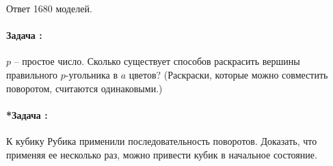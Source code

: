 \documentclass[amsmath,amssymb,12pt]{revtex4}
\newif\ifimportant
\newcommand{\1}{\frac{1}{2}}
\begin{document}
Ответ
1680 моделей.
\fi

\addtocounter{prn}{1}
\vspace{0.3cm}
\paragraph*{Задача \theprn: }

$p$ – простое число. Сколько существует способов раскрасить вершины правильного $p$-угольника в $a$ цветов? (Раскраски, которые можно совместить поворотом, считаются одинаковыми.)

\ifimportant
\medskip
\noindent
Решение
Забудем временно про совмещение раскрасок поворотами. Тогда p вершин можно раскрасить $a^{p}$ способами (см. задачу 60348). Среди этих раскрасок есть a одноцветных. Каждая из оставшихся совмещается с p раскрасками (считая исходную). Поэтому различных неодноцветных раскрасок в p раз меньше:  $\frac{a^{p}-a}{p}$.

Ответ $\frac{a^{p}-a}{p}+a$.
  способов.
Замечания
1. Из этого результата немедленно следует Малая теорема Ферма (см. задачу 60736).
2. Подумайте, почему важна простота числа p.
\fi



\addtocounter{prn}{1}
\vspace{0.3cm}
\paragraph*{*Задача \theprn: }

К кубику Рубика применили последовательность поворотов. Доказать, что применяя ее несколько раз, можно привести кубик в начальное состояние. 
\end{document}
